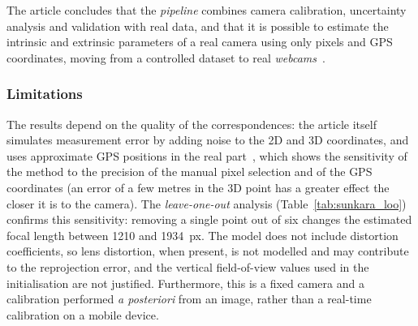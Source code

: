 The article concludes that the \textit{pipeline} combines camera calibration, uncertainty analysis and validation with real data, and that it is possible to estimate the intrinsic and extrinsic parameters of a real camera using only pixels and GPS coordinates, moving from a controlled dataset to real \textit{webcams}~\cite{sunkara2025}.

\subsubsection{Limitations}

The results depend on the quality of the correspondences: the article itself simulates measurement error by adding noise to the 2D and 3D coordinates, and uses approximate GPS positions in the real part~\cite{sunkara2025}, which shows the sensitivity of the method to the precision of the manual pixel selection and of the GPS coordinates (an error of a few metres in the 3D point has a greater effect the closer it is to the camera). The \textit{leave-one-out} analysis (Table~\ref{tab:sunkara_loo}) confirms this sensitivity: removing a single point out of six changes the estimated focal length between 1210 and 1934~px. The model does not include distortion coefficients, so lens distortion, when present, is not modelled and may contribute to the reprojection error, and the vertical field-of-view values used in the initialisation are not justified. Furthermore, this is a fixed camera and a calibration performed \textit{a posteriori} from an image, rather than a real-time calibration on a mobile device.